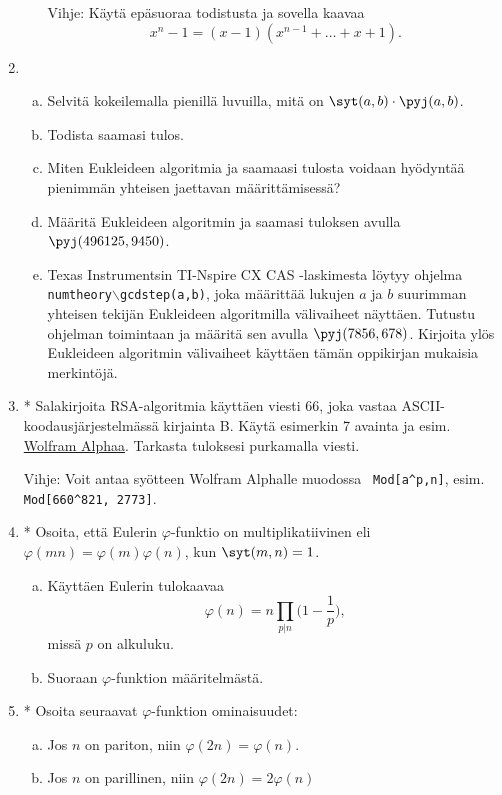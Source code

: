 \begin{enumerate}
\begin{enumerate}[a)]
Vihje: Käytä epäsuoraa todistusta ja sovella kaavaa
\[
x^n-1 = (x-1)(x^{n-1}+\ldots+x+1).
\]
\end{enumerate}

\item
\begin{enumerate}[a)]
\item Selvitä kokeilemalla pienillä luvuilla, mitä on
$\syt(a,b)\cdot \pyj(a,b)$.
\item Todista saamasi tulos.
\item Miten Eukleideen algoritmia ja saamaasi tulosta voidaan
hyödyntää pienimmän yhteisen jaettavan määrittämisessä?
\item Määritä Eukleideen algoritmin ja saamasi tuloksen
avulla\\ $\pyj(496125,9450)$.
\item Texas Instrumentsin TI-Nspire CX CAS -laskimesta löytyy
ohjelma {\tt numtheory$\backslash$gcdstep(a,b)}, joka määrittää
lukujen $a$ ja $b$ suurimman yhteisen tekijän Eukleideen
algoritmilla välivaiheet näyttäen. Tutustu ohjelman toimintaan ja
määritä sen avulla $\pyj(7856,678)$. Kirjoita ylös Eukleideen
algoritmin välivaiheet käyttäen tämän oppikirjan mukaisia
merkintöjä.
\end{enumerate}

\item * %
Salakirjoita RSA-algoritmia käyttäen
viesti $66$, joka vastaa ASCII-koodausjärjestelmässä kirjainta
B. Käytä esimerkin 7 avainta ja esim. \href{http://
www.wolframalpha.com}{Wolfram Alphaa}. Tarkasta tuloksesi
purkamalla viesti.

Vihje: Voit antaa syötteen Wolfram Alphalle muodossa {\tt
Mod[a\^{}p,n]}, esim. {\tt Mod[660\^{}821, 2773]}.


\item * %
Osoita, että Eulerin $\varphi$-funktio on multiplikatiivinen
eli $\varphi(mn) = \varphi(m) \varphi(n)$, kun $\syt(m,n)=1$.
\begin{enumerate}[a)]
\item Käyttäen Eulerin tulokaavaa
\[
\varphi(n)=n \prod_{p|n} \bigg(1-\frac{1}{p}\bigg),
\]
missä $p$ on alkuluku. 
\item
Suoraan $\varphi$-funktion määritelmästä.
\end{enumerate}

\item *  Osoita seuraavat $\varphi$-funktion ominaisuudet:
\begin{enumerate}[a)]
\item
Jos $n$ on pariton, niin $\varphi(2n)=\varphi(n)$.
\item
Jos $n$ on parillinen, niin $\varphi(2n)=2\varphi(n)$
\end{enumerate}


\end{enumerate}
